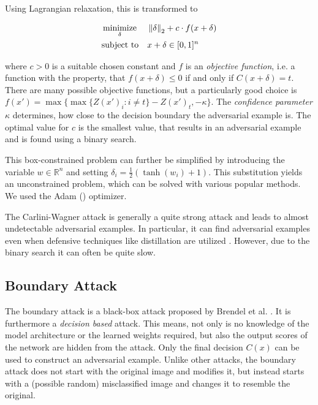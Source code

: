 Using Lagrangian relaxation, this is transformed to

\begin{equation}
\begin{aligned}
& \operatorname*{minimize}_{\delta} && \left \lVert \delta \right \rVert _2 + c \cdot f(x + \delta)\\
& \text{subject to} && x + \delta \in [0,1]^n
\end{aligned}
\end{equation}

where $c > 0$ is a suitable chosen constant and $f$ is an \emph{objective function}, i.e. a function with the property, that
$f(x + \delta) \leq 0$ if and only if $C(x + \delta) = t$.
There are many possible objective functions, but a particularly good choice is
$f(x') = \max \{ \max \{Z(x')_i : i \neq t \} - Z(x')_t, -\kappa \}$.
The \emph{confidence parameter} $\kappa$ determines, how close to the decision boundary the adversarial example is.
The optimal value for $c$ is the smallest value, that results in an adversarial example and is found using a binary search.

This box-constrained problem can further be simplified by introducing the variable $w \in \mathbb{R}^n$ and setting $\delta_i = \frac{1}{2} (\tanh(w_i) + 1)$.
This substitution yields an unconstrained problem, which can be solved with various popular methods. We used the Adam (\cite{adam}) optimizer.

The Carlini-Wagner attack is generally a quite strong attack and leads to almost undetectable adversarial examples.
In particular, it can find adversarial examples even when defensive techniques like distillation are utilized \cite{carlini}.
However, due to the binary search it can often be quite slow.

\subsection{Boundary Attack}

The boundary attack is a black-box attack proposed by Brendel et al. \cite{boundary}. It is furthermore a \emph{decision based} attack. This means, not only is no knowledge of the model architecture or the learned weights required, but also the output scores of the network are hidden from the attack. Only the final decision $C(x)$ can be used to construct an adversarial example.
Unlike other attacks, the boundary attack does not start with the original image and modifies it, but instead starts with a (possible random) misclassified image and changes it to resemble the original.

